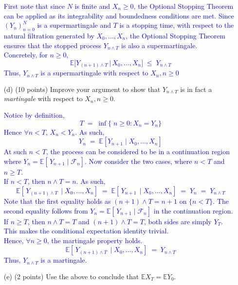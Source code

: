 \documentclass{article}
\begin{document}
\begin{enumerate}
        \textcolor{blue}{
            First note that since $N$ is finite and $X_n \geq 0$, the Optional Stopping Theorem can be applied as its integrability and boundedness conditions are met. 
            Since $(Y_n)_{n=0}^N$ is a supermartingale and $T$ is a stopping time, with respect to the natural filtration generated by $X_0,\ldots,X_n$, the Optional Stopping Theorem 
            ensures that the stopped process $Y_{n \wedge T}$ is also a supermartingale. \\
Concretely, for $n \ge 0$,
\[
\mathbb{E}\bigl[Y_{(n+1)\wedge T} \,\big\vert\, X_0,\ldots,X_n\bigr]
\;\le\;
Y_{n \wedge T}
\]
Thus, $Y_{n\wedge T}$ is a supermartingale with respect to $X_n, n \geq 0$
        }
    
    \item[(d)] (10 points) Improve your argument to show that $Y_{n \wedge T}$ is in fact a \textit{martingale} with respect to $X_n, n \geq 0$.

        \textcolor{blue}{
Notice by definition,
\[
T \;=\;\inf\{\; n \ge 0 : X_n = Y_n \}
\]
Hence $\forall n < T$, 
$X_n < Y_n$. As such, 
\[
Y_n \;=\;\mathbb{E}[Y_{n+1}\mid X_0,\ldots,X_n]
\]
At such $n<T$, the process can be considered to be in a continuation region where $Y_n = \mathbb{E}[\,Y_{n+1}\mid \mathcal{F}_n]$. Now consider the two cases, where $n < T$ and $n\geq T$. \\ 
If $n < T$, then $n\wedge T = n$. As such,
\[
\mathbb{E}[\,Y_{(n+1)\wedge T}\,\mid X_0,\ldots,X_n]
\;=\;
\mathbb{E}[\,Y_{n+1}\,\mid X_0,\ldots,X_n]
\;=\;
Y_n
\;=\;
Y_{n\wedge T}
\]
Note that the first equality holds as $(n+1)\wedge T = n+1$ on $\{n < T\}$. The second equality follows from $Y_n = \mathbb{E}[\,Y_{n+1}\mid \mathcal{F}_n]$ in the continuation region. \\ 
If $n \ge T$, then $n\wedge T = T$ and $(n+1)\wedge T = T$, both sides are simply $Y_T$. This makes the conditional expectation identity trivial. \\ 
Hence, $\forall n\ge 0$, the martingale property holds.
\[
\mathbb{E}[\,Y_{(n+1)\wedge T}\,\mid X_0,\ldots,X_n]
\;=\;
Y_{n\wedge T}
\]
Thus, $Y_{n\wedge T}$ is a martingale.
        }
    
    \item[(e)] (2 points) Use the above to conclude that $\mathbb{E}X_T = \mathbb{E}Y_0$.


\end{enumerate}
\end{document}
